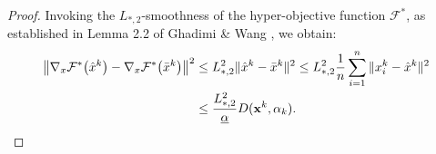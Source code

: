 \documentclass{article}
\theoremstyle{plain}
\theoremstyle{definition}
\theoremstyle{remark}
\begin{document}
\begin{proof}
Invoking the $L_{*,2}$-smoothness of the hyper-objective function $\mathcal{F}^{*}$, as established in Lemma 2.2 of Ghadimi \& Wang , we obtain:
\begin{align}\label{eq:bar_hat_diff}
    \big\|\nabla_{x} \mathcal{F}^{*}\big({\hat{x}}^k\big) -\nabla_{x} \mathcal{F}^{*}\big({\bar{x}}^k\big) \big\|^{2}
    &\leq L_{*,2}^{2}\| {\hat{x}}^k - {\bar{x}}^k\|^{2} 
    \leq L_{*,2}^{2} \frac{1}{n}\sum_{i=1}^{n}\| x_{i}^k-{\hat{x}}^k \|^{2}\notag
    \\
    &\leq \frac{L_{*,2}^{2}}{\underline{\alpha}} D(\mathbf{x}^{k},\alpha_{k}).
\end{align}


\end{proof}
\end{document}
